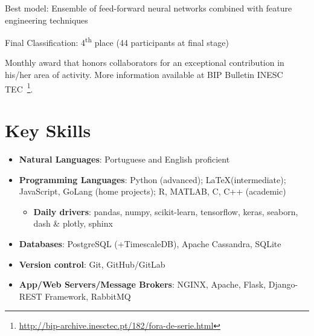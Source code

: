 \documentclass{mycv}
\begin{document}
{\begin{myitemize}
	\item Best model: Ensemble of feed-forward neural networks combined with feature engineering techniques
	\item Final Classification: 4\textsuperscript{th} place (44 participants at final stage)
\end{myitemize}



Monthly award that honors collaborators for an exceptional contribution in his/her area of activity. More information available at BIP Bulletin INESC TEC~\footnote{\url{http://bip-archive.inesctec.pt/182/fora-de-serie.html}}.


\vspace{0.5cm}

\section{Key Skills}

\begin{itemize}[itemsep=5px]
	
	\item \textbf{Natural Languages}: Portuguese and English proficient
	
	\item \textbf{Programming Languages}: Python (advanced); \LaTeX (intermediate); JavaScript, GoLang (home projects); R, MATLAB, C, C++ (academic)
	
	\begin{itemize}
		\item \textbf{Daily drivers}: pandas, numpy, scikit-learn, tensorflow, keras, seaborn, dash \& plotly, sphinx
	\end{itemize}
	
		
	\item \textbf{Databases}: PostgreSQL (+TimescaleDB), Apache Cassandra, SQLite
	
	\item \textbf{Version control}: Git, GitHub/GitLab
		
	\item \textbf{App/Web Servers/Message Brokers}: NGINX, Apache, Flask, Django-REST Framework, RabbitMQ
	

\end{itemize}}
\end{document}
